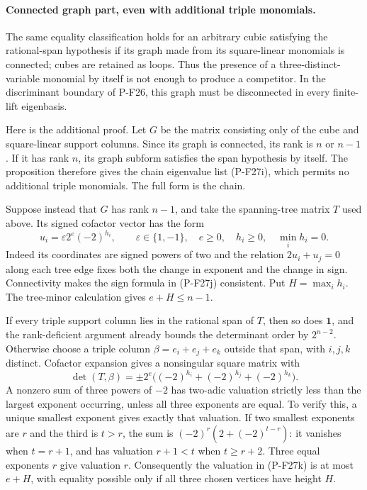 \paragraph{Connected graph part, even with additional triple monomials.}
The same equality classification holds for an arbitrary cubic satisfying
the rational-span hypothesis if its graph made from its square-linear
monomials is connected; cubes are retained as loops. Thus the presence
of a three-distinct-variable monomial by itself is not enough to produce
a competitor. In the discriminant boundary of P-F26, this graph must be
disconnected in every finite-lift eigenbasis.

Here is the additional proof. Let $G$ be the matrix consisting only
of the cube and square-linear support columns. Since its graph is
connected, its rank is $n$ or $n-1$. If it has rank $n$, its graph
subform satisfies the span hypothesis by itself. The proposition
therefore gives the chain eigenvalue list (P-F27i), which permits no
additional triple monomials. The full form is the chain.

Suppose instead that $G$ has rank $n-1$, and take the spanning-tree
matrix $T$ used above. Its signed cofactor vector has the form
\[
 u_i=\varepsilon 2^e(-2)^{h_i},\qquad
 \varepsilon\in\{1,-1\},\quad e\ge0,\quad
 h_i\ge0,\quad \min_i h_i=0.
 \tag{P-F27j}
\]
Indeed its coordinates are signed powers of two and the relation
$2u_i+u_j=0$ along each tree edge fixes both the change in exponent
and the change in sign. Connectivity makes the sign formula in
(P-F27j) consistent. Put $H=\max_i h_i$. The tree-minor calculation
gives $e+H\le n-1$.

If every triple support column lies in the rational span of $T$,
then so does $\mathbf1$, and the rank-deficient argument already
bounds the determinant order by $2^{n-2}$. Otherwise choose a triple
column $\beta=e_i+e_j+e_k$ outside that span, with $i,j,k$ distinct.
Cofactor expansion gives a nonsingular square matrix with
\[
 \det(T,\beta)=\pm 2^e
       \bigl((-2)^{h_i}+(-2)^{h_j}+(-2)^{h_k}\bigr).
 \tag{P-F27k}
\]
A nonzero sum of three powers of $-2$ has two-adic valuation strictly
less than the largest exponent occurring, unless all three exponents
are equal. To verify this, a unique smallest exponent gives exactly
that valuation. If two smallest exponents are $r$ and the third is
$t>r$, the sum is $(-2)^r(2+(-2)^{t-r})$: it vanishes when $t=r+1$,
and has valuation $r+1<t$ when $t\ge r+2$. Three equal exponents
$r$ give valuation $r$. Consequently the valuation in (P-F27k) is
at most $e+H$, with equality possible only if all three chosen
vertices have height $H$.

